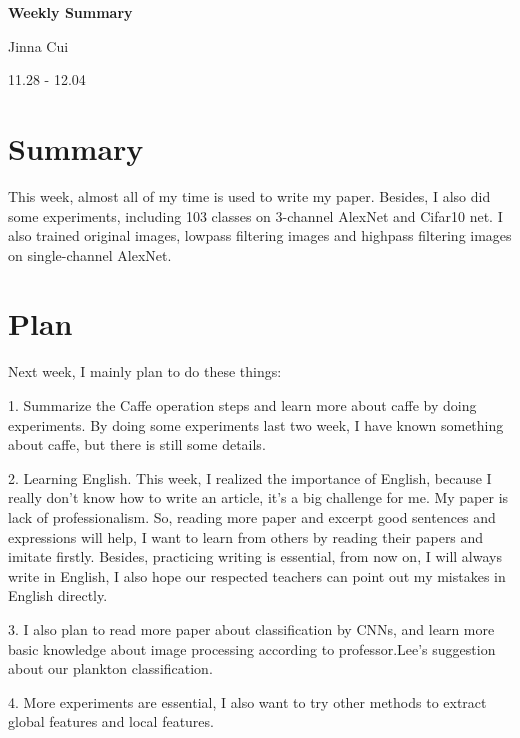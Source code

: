 \documentclass{article}
\begin{document}


\pagestyle{fancy}
\begin{center}
\textbf{\LARGE{Weekly Summary}} %
\end{center}

\begin{center}
Jinna Cui
\end{center}

\begin{center}
11.28 - 12.04
\end{center}
\section{Summary}
This week, almost all of my time is used to write my paper. Besides, I also did some experiments, including 103 classes on 3-channel AlexNet and Cifar10 net.  I also trained original images, lowpass filtering images and highpass filtering images on single-channel AlexNet. 

\section{Plan}
Next week, I mainly plan to do these things:

1. Summarize the Caffe operation steps and learn more about caffe by doing experiments. By doing some experiments last two week, I have known something about caffe, but there is still some details.

2. Learning English. This week, I realized the importance of English, because I really don't know how to write an article, it's a big challenge for me. My paper is lack of professionalism. So, reading more paper and excerpt good sentences and expressions will help, I want to learn from others by reading their papers and  imitate firstly. Besides, practicing writing is essential, from now on, I will always write in English, I also hope our respected teachers can point out my mistakes in English directly. 

3. I also plan to read more paper about classification by CNNs, and learn more basic knowledge about image processing according to professor.Lee's suggestion about our plankton classification. 

4. More experiments are essential, I also want to try other methods to extract global features and local features. 
\end{document}
